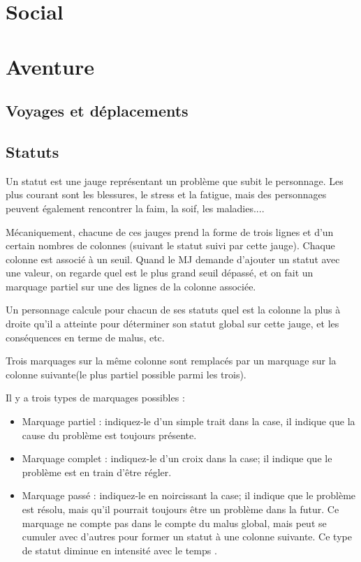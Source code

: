 \documentclass[10pt,a4paper,twocolumn]{book}
\begin{document}
\chapter{Social}
\chapter{Aventure}
\section{Voyages et déplacements}
\section{Statuts}
Un statut est une jauge représentant un problème que subit le personnage. Les plus courant sont les blessures, le stress et la fatigue, mais des personnages peuvent également rencontrer la faim, la soif, les maladies....

Mécaniquement, chacune de ces jauges prend la forme de trois lignes et d'un certain nombres de colonnes (suivant le statut suivi par cette jauge). Chaque colonne est associé à un seuil. Quand le MJ demande d'ajouter un statut avec une valeur, on regarde quel est le plus grand seuil dépassé, et on fait un marquage partiel sur une des lignes de la colonne associée. 

Un personnage calcule pour chacun de ses statuts quel est la colonne la plus à droite qu'il a atteinte pour déterminer son statut global sur cette jauge, et les conséquences en terme de malus, etc.

Trois marquages sur la même colonne sont remplacés par un marquage sur la colonne suivante(le plus partiel possible parmi les trois).

Il y a trois types de marquages possibles :
\begin{itemize}
\item Marquage partiel : indiquez-le d'un simple trait dans la case, il indique que la cause du problème est toujours présente.
\item Marquage complet : indiquez-le d'un croix dans la case; il indique que le problème est en train d'être régler.
\item Marquage passé : indiquez-le en noircissant la case; il indique que le problème est résolu, mais qu'il pourrait toujours être un problème dans la futur. Ce marquage ne compte pas dans le compte du malus global, mais peut se cumuler avec d'autres pour former un statut à une colonne suivante. Ce type de statut diminue en intensité avec le temps .
\end{itemize}
\end{document}

